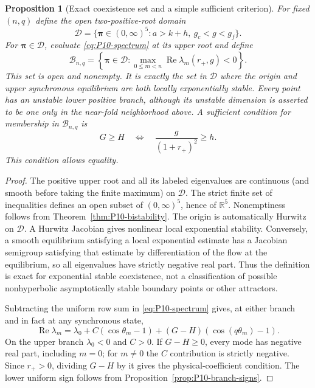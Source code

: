 \documentclass[11pt]{article}
\newcommand{\R}{\mathbb{R}}
\newcommand{\param}{\boldsymbol{\pi}}
\DeclareMathOperator{\Ree}{Re}
\newtheorem{proposition}[theorem]{Proposition}
\theoremstyle{definition}
\theoremstyle{remark}
\begin{document}
\begin{proposition}[Exact coexistence set and a simple sufficient criterion]
\label{prop:P10-bistability-set}
For fixed $(n,q)$ define the open two-positive-root domain
\[
 \mathcal D=\{\param\in(0,\infty)^5:a>k+h,\ g_c<g<g_f\}.
\]
For $\param\in\mathcal D$, evaluate \eqref{eq:P10-spectrum} at its
upper root and define
\begin{equation}
 \boxed{\mathcal B_{n,q}=
 \left\{\param\in\mathcal D:
 \max_{0\le m<n}\Ree\lambda_m(r_+,g)<0\right\}.}
 \label{eq:P10-B}
\end{equation}
This set is open and nonempty. It is exactly the set in $\mathcal D$
where the origin and upper synchronous equilibrium are both locally
exponentially stable. Every point has an unstable lower positive
branch, although its unstable dimension is asserted to be one only
in the near-fold neighborhood above. A sufficient condition for
membership in $\mathcal B_{n,q}$ is
\begin{equation}
 \boxed{G\ge H\quad\Longleftrightarrow\quad
 \frac{g}{(1+r_+)^2}\ge h.}
 \label{eq:P10-sufficient}
\end{equation}
This condition allows equality.
\end{proposition}
\begin{proof}
The positive upper root and all its labeled eigenvalues are continuous
(and smooth before taking the finite maximum) on $\mathcal D$.
The strict finite set of inequalities defines an open subset of
$(0,\infty)^5$, hence of $\R^5$. Nonemptiness follows from
Theorem~\ref{thm:P10-bistability}. The origin is automatically Hurwitz
on $\mathcal D$. A Hurwitz Jacobian gives nonlinear local exponential
stability. Conversely, a smooth equilibrium satisfying a local
exponential estimate has a Jacobian semigroup satisfying that estimate
by differentiation of the flow at the equilibrium, so all eigenvalues
have strictly negative real part. Thus the definition is exact for
exponential stable coexistence, not a classification of possible
nonhyperbolic asymptotically stable boundary points or other attractors.

Subtracting the uniform row sum in \eqref{eq:P10-spectrum} gives,
at either branch and in fact at any synchronous state,
\begin{equation}
 \Ree\lambda_m=\lambda_0+C(\cos\theta_m-1)
                         +(G-H)(\cos(q\theta_m)-1).
 \label{eq:P10-difference}
\end{equation}
On the upper branch $\lambda_0<0$ and $C>0$. If $G-H\ge0$,
every mode has negative real part, including $m=0$; for $m\ne0$
the $C$ contribution is strictly negative. Since $r_+>0$, dividing
$G-H$ by it gives the physical-coefficient condition. The lower
uniform sign follows from Proposition~\ref{prop:P10-branch-signs}.
\end{proof}
\end{document}
